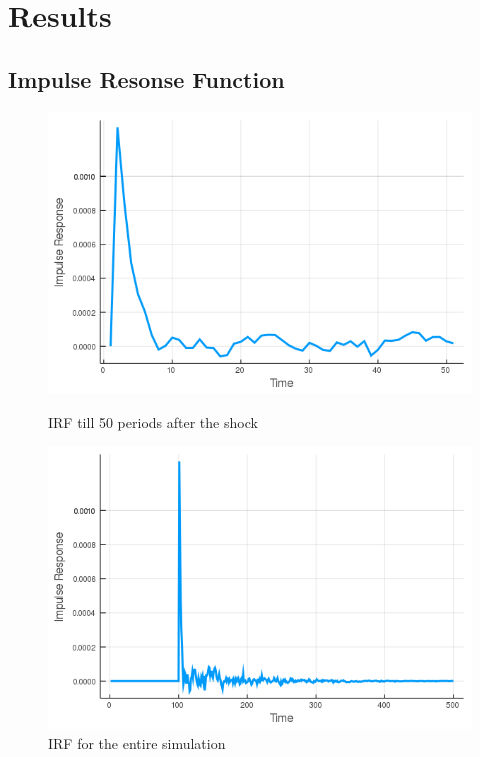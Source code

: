 \section{Results}

\subsection{Impulse Resonse Function}


\begin{figure}
    \centering
    \begin{minipage}{0.48\textwidth}
        \centering
        \includegraphics[width = \textwidth]{../tasks/Golosov_lucas/output/C_irf_50_periods.png}
        \caption{IRF till 50 periods after the shock}
        \label{irf1}
    \end{minipage}
    \begin{minipage}{0.48\textwidth}
        \centering
        \includegraphics[width=\textwidth]{../tasks/Golosov_lucas/output/C_irf_500_periods.png}
        \caption{IRF for the entire simulation}
        \label{irf2}
    \end{minipage}
\end{figure}

